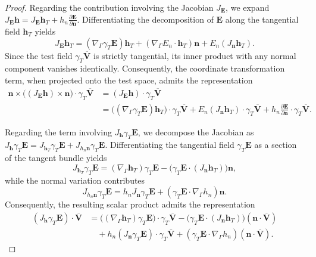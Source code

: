 \documentclass[12pt,reqno]{amsart}
\theoremstyle{definition}
\numberwithin{equation}{section}
\begin{document}
\begin{proof}
Regarding the contribution involving the Jacobian $J_{\mathbf{E}}$, we expand $J_{\mathbf{E}} \mathbf{h} = J_{\mathbf{E}} \mathbf{h}_T + h_n \frac{\partial \mathbf{E}}{\partial \mathbf{n}}$. Differentiating the decomposition of $\mathbf{E}$ along the tangential field $\mathbf{h}_T$ yields
\[
J_{\mathbf{E}} \mathbf{h}_T = (\nabla_\Gamma \gamma_T \mathbf{E}) \mathbf{h}_T + (\nabla_\Gamma E_n \cdot \mathbf{h}_T) \mathbf{n} + E_n (J_{\mathbf{n}} \mathbf{h}_T).
\]
Since the test field $\gamma_T \overline{\mathbf{V}}$ is strictly tangential, its inner product with any normal component vanishes identically. Consequently, the coordinate transformation term, when projected onto the test space, admits the representation
\[
\begin{aligned}
\mathbf{n} \times \bigl( (J_{\mathbf{E}} \mathbf{h}) \times \mathbf{n} \bigr) \cdot \gamma_T \overline{\mathbf{V}} &= (J_{\mathbf{E}} \mathbf{h}) \cdot \gamma_T \overline{\mathbf{V}} \\
&= \bigl( (\nabla_\Gamma \gamma_T \mathbf{E}) \mathbf{h}_T \bigr) \cdot \gamma_T \overline{\mathbf{V}} + E_n (J_{\mathbf{n}} \mathbf{h}_T) \cdot \gamma_T \overline{\mathbf{V}} + h_n \frac{\partial \mathbf{E}}{\partial \mathbf{n}} \cdot \gamma_T \overline{\mathbf{V}}.
\end{aligned}
\]

Regarding the term involving $J_{\mathbf{h}} \gamma_T \mathbf{E}$, we decompose the Jacobian as $J_{\mathbf{h}} \gamma_T \mathbf{E} = J_{\mathbf{h}_T} \gamma_T \mathbf{E} + J_{h_n \mathbf{n}} \gamma_T \mathbf{E}$. Differentiating the tangential field $\gamma_T \mathbf{E}$ as a section of the tangent bundle yields
\[
J_{\mathbf{h}_T} \gamma_T \mathbf{E} = (\nabla_\Gamma \mathbf{h}_T) \gamma_T \mathbf{E} - \bigl( \gamma_T \mathbf{E} \cdot (J_{\mathbf{n}} \mathbf{h}_T) \bigr) \mathbf{n},
\]
while the normal variation contributes
\[
J_{h_n \mathbf{n}} \gamma_T \mathbf{E} = h_n J_{\mathbf{n}} \gamma_T \mathbf{E} + (\gamma_T \mathbf{E} \cdot \nabla_\Gamma h_n) \mathbf{n}.
\]
Consequently, the resulting scalar product admits the representation
\[
\begin{aligned}
(J_{\mathbf{h}} \gamma_T \mathbf{E}) \cdot \overline{\mathbf{V}} &= \bigl( (\nabla_\Gamma \mathbf{h}_T) \gamma_T \mathbf{E} \bigr) \cdot \gamma_T \overline{\mathbf{V}} - \bigl( \gamma_T \mathbf{E} \cdot (J_{\mathbf{n}} \mathbf{h}_T) \bigr) (\mathbf{n} \cdot \overline{\mathbf{V}}) \\
&\quad + h_n (J_{\mathbf{n}} \gamma_T \mathbf{E}) \cdot \gamma_T \overline{\mathbf{V}} + (\gamma_T \mathbf{E} \cdot \nabla_\Gamma h_n) (\mathbf{n} \cdot \overline{\mathbf{V}}).
\end{aligned}
\]


\end{proof}
\end{document}
